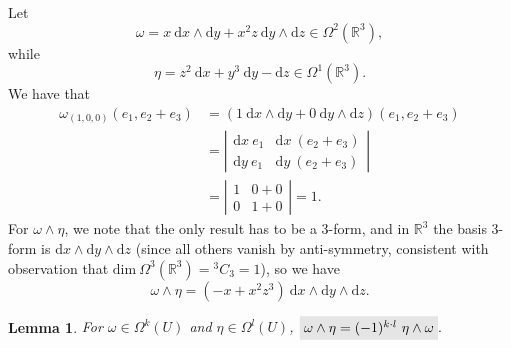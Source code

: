\documentclass[letter-paper]{tufte-book}
\newtheorem{lemma}[theorem]{\color{pastel-blue}Lemma}
\newenvironment{example}[1][Example]{\begin{trivlist}
\item[\hskip \labelsep {\bfseries #1}]}{\end{trivlist}}
\newcommand{\highlight}[1]{\mathchoice%
  {\colorbox{black!10}{$\displaystyle#1$}}%
  {\colorbox{black!10}{$\textstyle#1$}}%
  {\colorbox{black!10}{$\scriptstyle#1$}}%
  {\colorbox{black!10}{$\scriptscriptstyle#1$}}}%
\begin{document}
\begin{example}
  Let
  \begin{equation*}
    \omega = x\ \mathrm{d}x \wedge \mathrm{d}y + x^2 z\ \mathrm{d}y \wedge \mathrm{d}z \in \Omega^2(\mathbb{R}^3),
  \end{equation*}
  while
  \begin{equation*}
    \eta = z^2\ \mathrm{d}x + y^3\ \mathrm{d}y - \mathrm{d}z \in \Omega^1(\mathbb{R}^3).
  \end{equation*}
  We have that
  \begin{align*}
    \omega_{(1,0,0)}(e_1, e_2 + e_3) 
      &= (1\ \mathrm{d}x \wedge \mathrm{d}y + 0\ \mathrm{d}y \wedge \mathrm{d}z)(e_1, e_2 + e_3) \\
      &= \left|\begin{matrix}\mathrm{d}x\ e_1  & \mathrm{d}x\ (e_2 + e_3)\\ \mathrm{d}y\ e_1  & \mathrm{d}y\ (e_2 + e_3)\end{matrix}\right|\\
      &= \left|\begin{matrix}1  & 0 + 0\\ 0  & 1 + 0\end{matrix}\right| = 1.
  \end{align*}
  For $\omega\wedge\eta$, we note that the only result has to be a 3-form, and in $\mathbb{R}^3$ the basis 3-form is $\mathrm{d}x \wedge \mathrm{d}y \wedge \mathrm{d}z$ (since all others vanish by anti-symmetry, consistent with observation that $\mbox{dim}\ \Omega^3(\mathbb{R}^3) = {}^3C_3 = 1$), so we have
  \begin{equation*}
    \omega\wedge\eta = (-x + x^2 z^3)\ \mathrm{d}x \wedge \mathrm{d}y \wedge \mathrm{d}z.
  \end{equation*}
\end{example}

\begin{lemma}
 For $\omega \in \Omega^k(U)$ and $\eta \in \Omega^l(U)$, $\highlight{\omega \wedge \eta = (-1)^{k\cdot l}\ \eta \wedge \omega}.$
\end{lemma}
\end{document}

